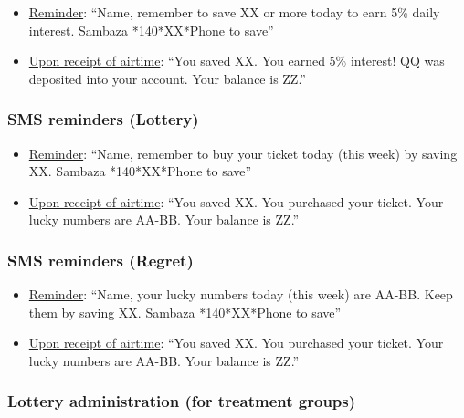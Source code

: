 \documentclass[11pt]{article}
\begin{document}
            \begin{itemize}
                \item \underline{Reminder}: ``{Name}, remember to save XX or more today to earn 5\% daily interest. Sambaza *140*XX*Phone to save''
                \item \underline{Upon receipt of airtime}: ``You saved XX. You earned 5\% interest!  QQ was deposited into your account. Your balance is ZZ.''
            \end{itemize}

        \subsubsection{SMS reminders (Lottery)}

            \begin{itemize}
                \item \underline{Reminder}: ``{Name}, remember to buy your ticket today (this week) by saving XX. Sambaza *140*XX*Phone to save''
                \item \underline{Upon receipt of airtime}: ``You saved XX. You purchased your ticket. Your lucky numbers are AA-BB. Your balance is ZZ.''
            \end{itemize}

        \subsubsection{SMS reminders (Regret)}

            \begin{itemize}
                \item \underline{Reminder}: ``{Name}, your lucky numbers today (this week) are AA-BB. Keep them by saving XX. Sambaza *140*XX*Phone to save''
                \item \underline{Upon receipt of airtime}: ``You saved XX. You purchased your ticket. Your lucky numbers are AA-BB. Your balance is ZZ.''
            \end{itemize}

        \subsubsection{Lottery administration (for treatment groups)}
\end{document}
